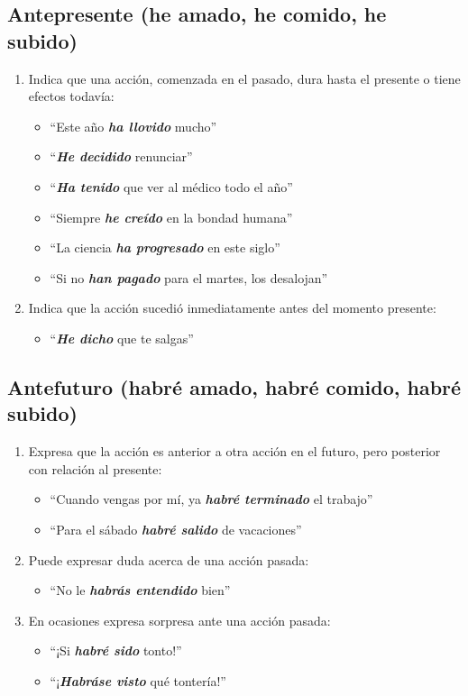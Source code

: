 \documentclass[14pt]{extarticle}
\newcommand{\marcatexto}[1]{\textbf{\textit{#1}}}
\begin{document}
\subsection{Antepresente (he amado, he comido, he subido)}

\begin{enumerate}[label=\alph*)]
\item  Indica que una acción, comenzada en el pasado, dura hasta el presente o tiene efectos todavía: 
\begin{itemize}
\item \enquote{Este año \marcatexto{ha llovido} mucho}
\item \enquote{\marcatexto{He decidido} renunciar}
\item \enquote{\marcatexto{Ha tenido} que ver al médico todo el año}
\item \enquote{Siempre \marcatexto{he creído} en la bondad humana}
\item \enquote{La ciencia \marcatexto{ha progresado} en este siglo}
\item \enquote{Si no \marcatexto{han pagado} para el martes, los desalojan}
\end{itemize}
\item Indica que la acción sucedió inmediatamente antes del momento presente:
\begin{itemize}
\item \enquote{\marcatexto{He dicho} que te salgas}
\end{itemize}
\end{enumerate}

\subsection{Antefuturo (habré amado, habré comido, habré subido)}

\begin{enumerate}[label=\alph*)]
\item Expresa que la acción es anterior a otra acción en el futuro, pero posterior con relación al presente:
\begin{itemize}
\item \enquote{Cuando vengas por mí, ya \marcatexto{habré terminado} el trabajo}
\item \enquote{Para el sábado \marcatexto{habré salido} de vacaciones}
\end{itemize}
\item Puede expresar duda acerca de una acción pasada:
\begin{itemize}
\item \enquote{No le \marcatexto{habrás entendido} bien}
\end{itemize}
\item En ocasiones expresa sorpresa ante una acción pasada:
\begin{itemize}
\item \enquote{¡Si \marcatexto{habré sido} tonto!}
\item \enquote{¡\marcatexto{Habráse visto} qué tontería!}
\end{itemize}
\end{enumerate}
\end{document}
